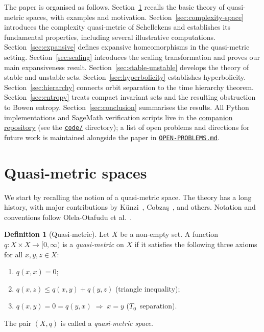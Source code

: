 \documentclass[11pt,a4paper]{article}
\newcommand{\repourl}{https://github.com/gabayae/expansive-homeomorphisms-complexity-qmetric}
\theoremstyle{plain}
\theoremstyle{definition}
\newtheorem{definitioninner}[theoreminner]{Definition}
\newenvironment{definition}[1][]{\begin{definitioninner}[#1]}{\end{definitioninner}}
\begin{document}
The paper is organised as follows.  Section~\ref{sec:quasi-metric}
recalls the basic theory of quasi-metric spaces, with examples and
motivation.  Section~\ref{sec:complexity-space} introduces the
complexity quasi-metric of Schellekens and establishes its
fundamental properties, including several illustrative computations.
Section~\ref{sec:expansive} defines expansive homeomorphisms in the
quasi-metric setting.  Section~\ref{sec:scaling} introduces the
scaling transformation and proves our main expansiveness result.
Section~\ref{sec:stable-unstable} develops the theory of stable and
unstable sets.  Section~\ref{sec:hyperbolicity} establishes
hyperbolicity.  Section~\ref{sec:hierarchy} connects orbit
separation to the time hierarchy theorem.
Section~\ref{sec:entropy} treats compact invariant sets and the
resulting obstruction to Bowen entropy.
Section~\ref{sec:conclusion} summarises the results.  All Python
implementations and SageMath verification scripts live in the
\href{\repourl}{companion repository} (see the
\href{\repourl/tree/main/code}{\texttt{code/}} directory); a list
of open problems and directions for future work is maintained
alongside the paper in
\href{\repourl/blob/main/OPEN-PROBLEMS.md}{\texttt{OPEN-PROBLEMS.md}}.


\section{Quasi-metric spaces}
\label{sec:quasi-metric}

We start by recalling the notion of a quasi-metric space.  The
theory has a long history, with major contributions by
K\"unzi~\cite{kunzi1995, kunzi2001},
Cobza\c{s}~\cite{cobzas2013}, and others.  Notation and conventions
follow Olela-Otafudu et al.~\cite{olela2024}.

\begin{definition}[Quasi-metric]\label{def:quasi-metric}
Let $X$ be a non-empty set.  A function
$q\colon X\times X\to[0,\infty)$ is a \emph{quasi-metric} on $X$
if it satisfies the following three axioms for all $x,y,z\in X$:
\begin{enumerate}[label=\textup{(Q\arabic*)},leftmargin=3em]
    \item $q(x,x)=0$; \label{Q1}
    \item $q(x,z)\le q(x,y)+q(y,z)$ \quad(triangle inequality); \label{Q2}
    \item $q(x,y)=0=q(y,x)\;\Rightarrow\;x=y$
      \quad($T_0$~separation). \label{Q3}
\end{enumerate}
The pair $(X,q)$ is called a \emph{quasi-metric space}.
\end{definition}
\end{document}
